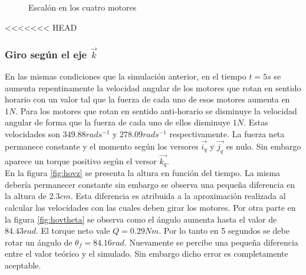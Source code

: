 \documentclass[main]{subfiles}
\begin{document}
\begin{figure} [h!]
  \centering
  \caption{Escal\'on en los cuatro motores}
  \label{fig:escalon}
\end{figure}
<<<<<<< HEAD

\subsubsection{Giro seg\'un el eje $\vec{k}$}

En las mismas condiciones que la simulaci\'on anterior, en el tiempo $t=5s$ se aumenta repentinamente la velocidad angular de los motores que rotan en sentido horario con un valor tal que la fuerza de cada uno de esos motores aumenta en $1N$. Para los motores que rotan en sentido anti-horario se disminuye la velocidad angular de forma que la fuerza de cada uno de ellos disminuye $1N$. Estas velocidades son $349.88rads^{-1}$ y $278.09rads^{-1}$ respectivamente. La fuerza neta permanece constante y el momento seg\'un los versores $\vec{i_q}$ y $\vec{j_q} $ es nulo. Sin embargo aparece un torque positivo seg\'un el versor $\vec{k_q}$.\\

En la figura \ref{fig:hovz} se presenta la altura en funci\'on del tiempo. La misma deber\'ia permanecer constante sin embargo se observa una peque\~na diferencia en la altura de $2.3cm$. Esta diferencia es atribuida a la aproximaci\'on realizada al calcular las velocidades con las cuales deben girar los motores. Por otra parte en la figura \ref{fig:hovtheta} se observa como el \'angulo aumenta hasta el valor de $84.43 rad$. El torque neto vale $Q = 0.29Nm $. Por lo tanto en 5 segundos se debe rotar un \'angulo de $\theta_f=84.16rad$. Nuevamente se percibe una peque\~na diferencia entre el valor te\'orico y el simulado. Sin embargo dicho error es completamente aceptable. 
\end{document}
